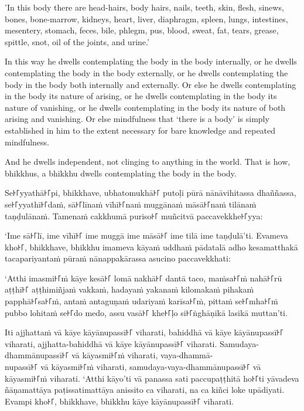 'In this body there are head-hairs, body hairs, nails, teeth, skin, flesh,
sinews, bones, bone-marrow, kidneys, heart, liver, diaphragm, spleen, lungs,
intestines, mesentery, stomach, feces, bile, phlegm, pus, blood, sweat, fat,
tears, grease, spittle, snot, oil of the joints, and urine.'

In this way he dwells contemplating the body in the body internally, or he
dwells contemplating the body in the body externally, or he dwells contemplating
the body in the body both internally and externally. Or else he dwells
contemplating in the body its nature of arising, or he dwells contemplating in
the body its nature of vanishing, or he dwells contemplating in the body its
nature of both arising and vanishing. Or else mindfulness that ‘there is a body’
is simply established in him to the extent necessary for bare knowledge and
repeated mindfulness.

And he dwells independent, not clinging to anything in the world. That is how,
bhikkhus, a bhikkhu dwells contemplating the body in the body.


\paliPage

Se꜔꜒yyathā꜔꜒pi, bhikkhave, ubhatomukhā꜔꜒ putoḷi pūrā nānāvihitassa dhaññassa,
se꜔꜒yyathī꜔꜒daṁ, sā꜔꜒līnaṁ vīhī꜔꜒naṁ muggānaṁ māsā꜔꜒naṁ tilānaṁ taṇḍulānaṁ. Tamenaṁ
cakkhumā puriso꜔꜒ muñcitvā paccavekkhe꜔꜒yya:

‘Ime sā꜔꜒lī, ime vīhī꜔꜒ ime muggā ime māsā꜔꜒ ime tilā ime taṇḍulā’ti. Evameva kho꜔꜒,
bhikkhave, bhikkhu imameva kāyaṁ uddhaṁ pādatalā adho kesamatthakā
tacapariyantaṁ pūraṁ nānappakārassa asucino paccavekkhati:

‘Atthi imasmi꜔꜒ṁ kāye kesā꜔꜒ lomā nakhā꜔꜒ dantā taco, maṁsa꜔꜒ṁ nahā꜔꜒rū aṭṭhī꜔꜒ aṭṭhimiñjaṁ
vakkaṁ, hadayaṁ yakanaṁ kilomakaṁ pihakaṁ papphā꜔꜒sa꜔꜒ṁ, antaṁ antaguṇaṁ udariyaṁ
karīsa꜔꜒ṁ, pittaṁ se꜔꜒mha꜔꜒ṁ pubbo lohitaṁ se꜔꜒do medo, assu vasā꜔꜒ khe꜔꜒ḷo si꜔꜒ṅghāṇikā
lasikā muttan’ti.

Iti ajjhattaṁ vā kāye kāyānupassī꜔꜒ viharati, bahiddhā vā kāye kāyānupassī꜔꜒
viharati, ajjhatta-bahiddhā vā kāye kāyānupassī꜔꜒ viharati. Samudaya-dhammānupassī꜔꜒
vā kāyasmi꜔꜒ṁ viharati, vaya-dhammā-\\
nupassī꜔꜒ vā kāyasmi꜔꜒ṁ viharati, samudaya-vaya-dhammānupassī꜔꜒ vā kāyasmi꜔꜒ṁ viharati.
‘Atthi kāyo’ti vā panassa sati paccupaṭṭhitā ho꜔꜒ti yāvadeva ñāṇamattāya
paṭissatimattāya anissito ca viharati, na ca kiñci loke upādiyati. Evampi kho꜔꜒,
bhikkhave, bhikkhu kāye kāyānupassī꜔꜒ viharati.

